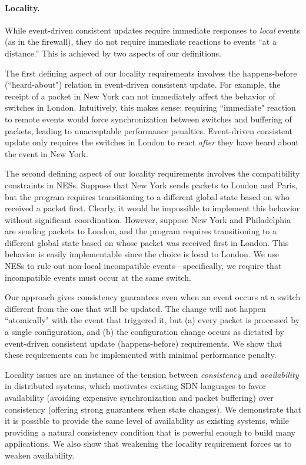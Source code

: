 \documentclass[pldi-cameraready]{sigplanconf}
\begin{document}
\paragraph*{Locality.}
While event-driven consistent updates require immediate responses to
{\em local} events (as in the firewall), they do
not require immediate reactions to events ``at a distance.'' This is
achieved by two aspects of our definitions. 

The first defining aspect of our locality requirements involves the
happens-before (``heard-about") relation in 
event-driven consistent update. 
For example, the receipt of a packet in New
York can not immediately affect the behavior of switches in
London. Intuitively, this makes sense: requiring ``immediate" reaction to
remote events would force synchronization between switches
and buffering of packets, leading to unacceptable performance
penalties. Event-driven consistent update only requires the switches in
London to react {\em after} they have heard about the event in New York.

The second defining aspect of our locality requirements involves the
compatibility constraints in NESs. 
Suppose that New York sends packets to London and Paris, but the program
requires transitioning to a different global state based on who
received a packet first. Clearly, it
would be impossible to implement this behavior without significant
coordination. However, suppose New York and Philadelphia are
sending packets to London, and the program
requires transitioning to a different global state based on whose 
packet was received first in London. This behavior is
easily implementable since the choice is local to London. 
We use NESs to rule out non-local incompatible events---specifically,
we require that incompatible events must occur at the same switch.

Our approach gives consistency guarantees even when an event occurs at
a switch different from the one 
  that will be updated. The change will not happen
  ``atomically" with the event that triggered it, but (a) every
  packet is processed by a single configuration, and (b) the
  configuration change occurs as dictated by event-driven consistent
  update (happens-before) requirements. We show that these
  requirements can be implemented with minimal performance penalty.

Locality issues are an instance of the tension between {\em consistency} and {\em availability}
in distributed systems, which motivates existing
SDN languages to favor availability (avoiding expensive synchronization
and packet buffering) over consistency (offering strong guarantees when state
changes). 
We demonstrate that it is possible to provide the same level
of availability as existing systems, while providing a natural
consistency condition that 
is powerful enough to build many applications. We also show that
weakening the locality requirement forces us to weaken
availability.
\end{document}
